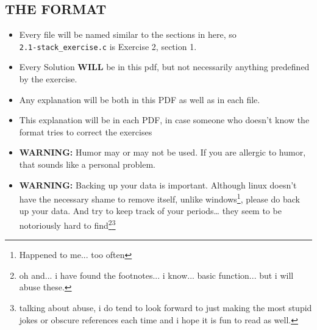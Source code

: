 \documentclass[a4paper, 11pt]{article}
\begin{document}
    \subsection*{THE FORMAT}
    \begin{itemize}
      \item Every file will be named similar to the sections in here, so\\
      \texttt{2.1-stack\_exercise.c} is Exercise 2, section 1.
      \item Every Solution \textbf{WILL} be in this pdf, but not necessarily 
            anything predefined by the exercise.
      \item Any explanation will be both in this PDF as well as in each file.
      \item This explanation will be in each PDF, in case someone who doesn't
            know the format tries to correct the exercises
      \item \textbf{WARNING:} Humor may or may not be used. If you are allergic
            to humor, that sounds like a personal problem.
      \item \textbf{WARNING:} Backing up your data is important. Although linux 
            doesn't have the necessary shame to remove itself, unlike windows\footnote{Happened to me... too often},
            please do back up your data. And try to keep track of your periods\dots
            they seem to be notoriously hard to find\footnote{oh and... i have found the footnotes... i know... basic function... but i will abuse these.}\footnote{talking about abuse, i do tend to look forward to just making the most stupid jokes or obscure references each time and i hope it is fun to read as well.}
    \end{itemize}
    \newpage
    
\end{document}
